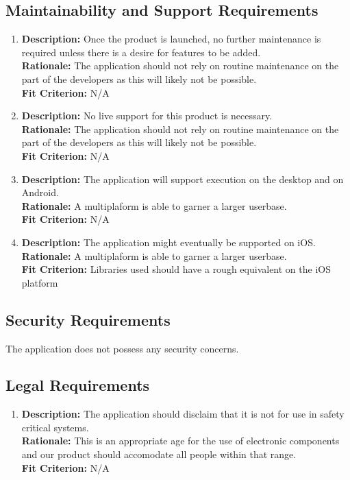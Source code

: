 \documentclass{article}
\begin{document}
\subsection{Maintainability and Support Requirements}
\begin{enumerate}
\item \textbf{Description: } Once the product is launched, no further maintenance is required unless there is a desire for features to be added.
\\ \textbf{Rationale: } The application should not rely on routine maintenance on the part of the developers as this will likely not be possible.
\\ \textbf{Fit Criterion:} N/A
\item \textbf{Description: } No live support for this product is necessary.
\\ \textbf{Rationale: } The application should not rely on routine maintenance on the part of the developers as this will likely not be possible.
\\ \textbf{Fit Criterion:} N/A
\item \textbf{Description: } The application will support execution on the desktop and on Android.
\\ \textbf{Rationale: } A multiplaform is able to garner a larger userbase.
\\ \textbf{Fit Criterion:} N/A
\item \textbf{Description: } The application might eventually be supported on iOS.
\\ \textbf{Rationale: } A multiplaform is able to garner a larger userbase.
\\ \textbf{Fit Criterion:}  Libraries used should have a rough equivalent on the iOS platform
\end{enumerate}
\subsection{Security Requirements}
The application does not possess any security concerns.
\subsection{Legal Requirements}

\begin{enumerate}
\item \textbf{Description: } The application should disclaim that it is not for use in safety critical systems.
\\ \textbf{Rationale: } This is an appropriate age for the use of electronic components and our product should accomodate all people within that range.
\\ \textbf{Fit Criterion:} N/A
\end{enumerate}
\end{document}
